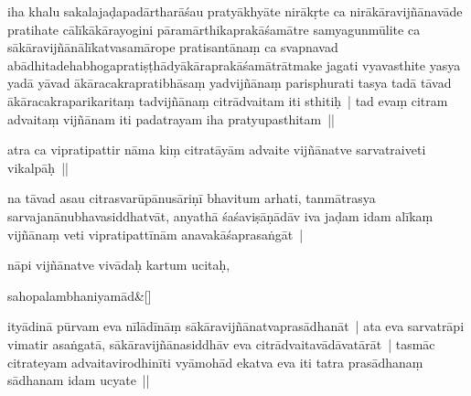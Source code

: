 \documentclass[article,12pt,a4paper]{memoir}%
\newcounter{parCount}
\begin{document}
	  
	  

	  \pstart \leavevmode%
	\label{thakur75-129.7}iha khalu sakalajaḍapadārtharāśau pratyākhyāte nirākṛte ca nirākāravijñānavāde pratihate cālīkākārayogini pāramārthikaprakāśamātre samyagunmūlite ca sākāravijñānālīkatvasamārope pratisantānaṃ ca svapnavad abādhitadehabhogapratiṣṭhādyākāraprakāśamātrātmake jagati vyavasthite yasya yadā yāvad ākāracakrapratibhāsaṃ yadvijñānaṃ parisphurati tasya tadā tāvad ākāracakraparikaritaṃ tadvijñānaṃ citrādvaitam iti sthitiḥ | tad evaṃ citram advaitaṃ vijñānam iti padatrayam iha pratyupasthitam || 
	{}
	\pend%
      

	  \pstart \leavevmode%
	\label{thakur75-129.13}atra ca vipratipattir nāma kiṃ citratāyām advaite vijñānatve sarvatraiveti vikalpāḥ || 
	{}
	\pend%
      

	  \pstart \leavevmode%
	\label{thakur75-129.14}na tāvad asau citrasvarūpānusāriṇī bhavitum arhati, tanmātrasya \label{ratnakīrtinibandhāvali__36r1PF7IMSTQ7OTJHL7VDAR91JN}sarvajanānu\label{ratnakīrtinibandhāvali__36r1PF7IMSRS80XSPP70EAGRVE0}bhavasiddhatvāt, anyathā śaśaviṣāṇādāv iva jaḍam idam alīkaṃ vijñānaṃ veti vipratipattīnām anavakāśaprasaṅgāt |
	{}
	\pend%
      

	  \pstart \leavevmode%
	nāpi vijñānatve vivādaḥ kartum ucitaḥ,
	{}
	\pend%
      
	    
	    \stanza[\smallbreak]
	  sahopalambhaniyamād\&[\smallbreak]
	  
	  
	  

	  \pstart \leavevmode%
	ityādinā pūrvam eva nīlādīnāṃ sākāravijñānatvaprasādhanāt | ata eva sarvatrāpi vimatir asaṅgatā, sākāravijñānasiddhāv eva citrādvaitavādāvatārāt | tasmāc citrateyam advaitavirodhinīti vyāmohād ekatva eva  iti tatra prasādhanaṃ sādhanam idam ucyate ||
	{}
	\pend%
      
\end{document}
